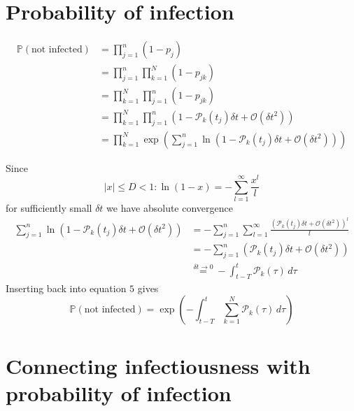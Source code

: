 \documentclass{article}
\begin{document}
\section{Probability of infection}

\begin{align}
  \mathbb{P}(\text{not infected}) &= \prod_{j=1}^n (1-p_j)\\
                                  &= \prod_{j=1}^n \prod_{k=1}^N (1-p_{jk})\\
                                  &= \prod_{k=1}^N \prod_{j=1}^n (1-p_{jk})\\
                                  &= \prod_{k=1}^N \prod_{j=1}^n \left(1-\mathcal{P}_k\left(t_j\right)\delta t + \mathcal{O}\left(\delta t^2\right)\right)\\
                                  &= \prod_{k=1}^N \exp\left( \sum_{j=1}^n \ln \left(1-\mathcal{P}_k\left(t_j\right)\delta t + \mathcal{O}\left(\delta t^2\right)\right) \right)
\end{align}

\noindent
Since
\[
  \lvert x \rvert \leq D < 1: \ln (1-x) = - \sum_{l=1}^\infty \frac{x^l}{l}
\]
for sufficiently small \(\delta t\) we have absolute convergence
\begin{align*}
  \sum_{j=1}^n \ln \left(1-\mathcal{P}_k\left(t_j\right)\delta t + \mathcal{O}\left(\delta t^2\right)\right) &= -\sum_{j=1}^n \sum_{l=1}^\infty \frac{\left( \mathcal{P}_k\left(t_j\right)\delta t + \mathcal{O}\left(\delta t^2\right)\right)^l}{l}\\
                                                                                                             &=-\sum_{j=1}^n \left( \mathcal{P}_k\left( t_j \right) \delta t + \mathcal{O}\left( \delta t^2 \right)\right)\\
  &\overset{\delta t \rightarrow 0}{=} - \int_{t-T}^t \mathcal{P}_k(\tau)\, d\tau
\end{align*}
Inserting back into equation \(5\) gives
\[
  \mathbb{P}(\text{not infected}) = \exp \left( - \int_{t-T}^t \sum_{k=1}^N
    \mathcal{P}_k(\tau)\,d\tau\right)
\]
\section{Connecting infectiousness with probability of infection}
\end{document}

